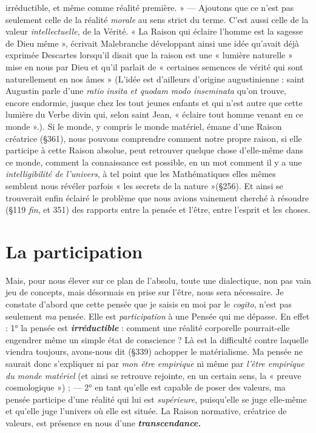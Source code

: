 irréductible, et même comme réalité première. » — Ajoutons que
ce n’est pas seulement celle de la réalité {\it morale} au sens
strict du terme. C’est aussi celle de la valeur {\it intellectuelle}, de la
Vérité. « La Raison qui éclaire l’homme est la sagesse de Dieu
même », écrivait Malebranche développant ainsi une idée qu'avait déjà exprimée
Descartes lorsqu'il disait que la raison est une « lumière naturelle »
mise en nous par Dieu et qu’il parlait de « certaines
semences de vérité qui sont naturellement en nos âmes »
{\scriptsize (L'idée est d’ailleurs d'origine augustinienne : saint Augustin parle d’une {\it ratio
insita et quodam modo inseminata} qu’on trouve, encore endormie, jusque chez les tout
jeunes enfants et qui n’est autre que cette lumière du Verbe divin qui, selon saint Jean,
« éclaire tout homme venant en ce monde ».)}.
Si le monde, y compris le monde matériel, émane d’une Raison
créatrice (\S 361), nous pouvons comprendre comment notre
propre raison, si elle participe à cette Raison absolue, peut
retrouver quelque chose d’elle-même dans ce monde, comment
la connaissance est possible, en un mot comment il y a une
{\it intelligibilité de l'univers}, à tel point que les Mathématiques
elles mêmes semblent nous révéler parfois « les secrets de la
nature »(\S 256). Et ainsi se trouverait enfin éclairé le problème
que nous avions vainement cherché à résoudre (\S 119 {\it fin},
et 351) des rapports entre la pensée et l’être, entre l'esprit
et les choses.
\section{La participation}%
Mais, pour nous élever sur ce plan
de l’absolu, toute une dialectique, non pas vain jeu de concepts, mais
désormais en prise sur l’être, nous sera nécessaire. Je constate d’abord
que cette pensée que je saisis en moi par le {\it cogito}, n’est pas seulement
{\it ma} pensée. Elle est {\it participation} à une Pensée qui me dépasse. En
effet : 1° la pensée est \textbf{\textit {irréductible}} : comment une réalité corporelle
pourrait-elle engendrer même un simple état de conscience ? Là est
la difficulté contre laquelle viendra toujours, avons-nous dit (\S 339)
achopper le matérialisme. Ma pensée ne saurait donc s’expliquer ni
par {\it mon être empirique} ni même par {\it l'être empirique du monde matériel}
(et ainsi se retrouve rejointe, en un certain sens, la « preuve cosmologique ») ;
— 2° en tant qu’elle est capable de poser des valeurs,
ma pensée participe d’une réalité qui lui est {\it supérieure}, puisqu’elle
se juge elle-même et qu’elle juge l’univers où elle est située. La Raison
normative, créatrice de valeurs, est présence en nous d’une
\textbf{\textit {transcendance.}}

